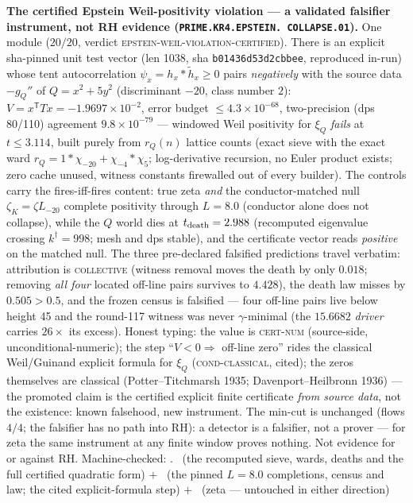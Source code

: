 \documentclass[11pt,a4paper]{article}
\theoremstyle{definition}
\begin{document}
\par\smallskip\noindent\textbf{The certified Epstein
Weil-positivity violation --- a validated falsifier instrument,
not RH evidence
(\texttt{PRIME.KR4.\allowbreak EPSTEIN.\allowbreak
COLLAPSE.01}).}
One module ($20/20$, verdict
\textsc{epstein-weil-violation-certified}).  There is an explicit
sha-pinned unit test vector (len 1038, sha
\texttt{b01436d53d2cbbee}, reproduced in-run) whose tent
autocorrelation $\psi_x = h_x * \tilde h_x \ge 0$ pairs
\emph{negatively} with the source data $-g_Q''$ of
$Q = x^2 + 5y^2$ (discriminant $-20$, class number $2$):
$V = x^{\mathsf T} T x = -1.9697\times10^{-2}$, error budget
$\le 4.3\times10^{-68}$, two-precision (dps 80/110) agreement
$9.8\times10^{-79}$ --- windowed Weil positivity for $\xi_Q$
\emph{fails} at $t \le 3.114$, built purely from $r_Q(n)$ lattice
counts (exact sieve with the exact ward
$r_Q = 1*\chi_{-20} + \chi_{-4}*\chi_5$; log-derivative
recursion, no Euler product exists; zero cache unused, witness
constants firewalled out of every builder).  The controls carry
the fires-iff-fires content: true zeta \emph{and} the
conductor-matched null $\zeta_K = \zeta L_{-20}$ complete
positivity through $L = 8.0$ (conductor alone does not collapse),
while the $Q$ world dies at $t_{\rm death} = 2.988$ (recomputed
eigenvalue crossing $k^\dagger = 998$; mesh and dps stable), and
the certificate vector reads \emph{positive} on the matched null.
The three pre-declared falsified predictions travel verbatim:
attribution is \textsc{collective} (witness removal moves the
death by only $0.018$; removing \emph{all four} located off-line
pairs survives to $4.428$), the death law misses by
$0.505 > 0.5$, and the frozen census is falsified --- four
off-line pairs live below height 45 and the round-117 witness was
never $\gamma$-minimal (the $15.6682$ \emph{driver} carries
$26\times$ its excess).  Honest typing: the value is
\textsc{cert-num} (source-side, unconditional-numeric); the step
``$V < 0 \Rightarrow$ off-line zero'' rides the classical
Weil/Guinand explicit formula for $\xi_Q$
(\textsc{cond-classical}, cited); the zeros themselves are
classical (Potter--Titchmarsh 1935; Davenport--Heilbronn 1936)
--- the promoted claim is the certified explicit finite
certificate \emph{from source data}, not the existence:
known falsehood, new instrument.  The min-cut is unchanged
(flows $4/4$; the falsifier has no path into RH): a detector is a
falsifier, not a prover --- for zeta the same instrument at any
finite window proves nothing.  Not evidence for or against RH.
Machine-checked: .
\mE\ (the recomputed sieve, wards, deaths and the full certified
quadratic form) $+$ \mC\ (the pinned $L = 8.0$ completions,
census and law; the cited explicit-formula step) $+$ \mO\ (zeta
--- untouched in either direction)
\par\smallskip
\end{document}
